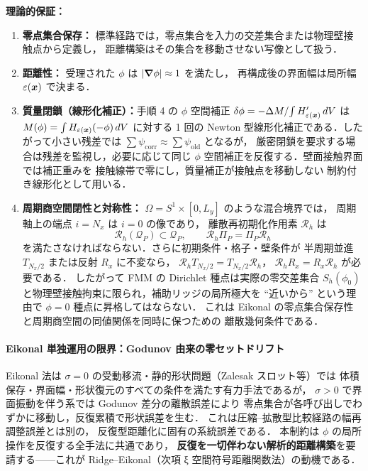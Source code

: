 \noindent\textbf{理論的保証：}
\begin{enumerate}
  \item \textbf{零点集合保存：}
        標準経路では，零点集合を入力の交差集合または物理壁接触点から定義し，
        距離構築はその集合を移動させない写像として扱う．
  \item \textbf{距離性：}
        受理された $\phi$ は $|\bm{\nabla}\phi|\approx1$ を満たし，
        再構成後の界面幅は局所幅 $\varepsilon(\bm{x})$ で決まる．
  \item \textbf{質量閉鎖（線形化補正）：}手順 4 の $\phi$ 空間補正
        $\delta\phi=-\Delta M/\!\int H'_{\varepsilon(\bm{x})}\,dV$ は
        $M(\phi)=\int H_{\varepsilon(\bm{x})}(-\phi)\,dV$ に対する 1 回の
        Newton 型線形化補正である．したがって小さい残差では
        $\sum\psi_{\mathrm{corr}}\approx\sum\psi_{\mathrm{old}}$ となるが，
        厳密閉鎖を要求する場合は残差を監視し，必要に応じて同じ
        $\phi$ 空間補正を反復する．壁面接触界面では補正重みを
        接触線帯で零にし，質量補正が接触点を移動しない
        制約付き線形化として用いる．
  \item \textbf{周期商空間閉性と対称性：}
        $\Omega=S^1\times[0,L_y]$ のような混合境界では，
        周期軸上の端点 $i=N_x$ は $i=0$ の像であり，
        離散再初期化作用素 $\mathcal{R}_h$ は
        \begin{equation}
          \mathcal{R}_h(\mathcal{Q}_P)\subset\mathcal{Q}_P,
          \qquad
          \mathcal{R}_h\Pi_P=\Pi_P\mathcal{R}_h
          \label{eq:reinit_periodic_quotient_closure}
        \end{equation}
        を満たさなければならない．さらに初期条件・格子・壁条件が
        半周期並進 $T_{N_x/2}$ または反射 $R_x$ に不変なら，
        $\mathcal{R}_h T_{N_x/2}=T_{N_x/2}\mathcal{R}_h$，
        $\mathcal{R}_h R_x=R_x\mathcal{R}_h$ が必要である．
        したがって FMM の Dirichlet 種点は実際の零交差集合
        $S_h(\phi_0)$ と物理壁接触拘束に限られ，補助リッジの局所極大を
        ``近いから'' という理由で $\phi=0$ 種点に昇格してはならない．
        これは Eikonal の零点集合保存性と周期商空間の同値関係を同時に保つための
        離散幾何条件である．
\end{enumerate}

\paragraph*{Eikonal 単独運用の限界：Godunov 由来の零セットドリフト}
Eikonal 法は $\sigma{=}0$ の受動移流・静的形状問題（Zalesak スロット等）では
体積保存・界面幅・形状復元のすべての条件を満たす有力手法であるが，
$\sigma>0$ で界面振動を伴う系では Godunov 差分の離散誤差により
零点集合が各呼び出しでわずかに移動し，反復累積で形状誤差を生む．
これは圧縮--拡散型比較経路の幅再調整誤差とは別の，
反復型距離化に固有の系統誤差である．
本制約は $\phi$ の局所操作を反復する全手法に共通であり，
\textbf{反復を一切伴わない解析的距離構築}を要請する——これが
Ridge--Eikonal（次項 ξ 空間符号距離関数法）の動機である．


